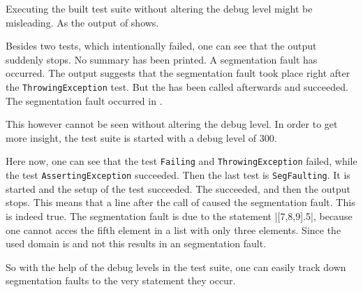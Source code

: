 

Executing the built test suite without altering the debug level might be misleading. As the output of  shows.


Besides two tests, which intentionally failed, one can see that the output suddenly stops. No summary has been printed. A segmentation fault has occurred.
The output suggests that the segmentation fault took place right after the {\tt ThrowingException} test. But the  has been called afterwards and succeeded. The segmentation fault occurred in .

This however cannot be seen without altering the debug level. In order to get more insight, the test suite is started with a debug level of $300$.


Here now, one can see that the test {\tt Failing} and {\tt ThrowingException} failed, while the test {\tt AssertingException} succeeded. Then the last test is {\tt SegFaulting}. It is started and the setup of the test succeeded. The  succeeded, and then the output stops. This means that a line after the call of  caused the segmentation fault. This is indeed true. The segmentation fault is due to the statement \adcode|[7,8,9].5|, because one cannot acces the fifth element in a list with only three elements. Since the used domain is  and not  this results in an segmentation fault.

So with the help of the debug levels in the test suite, one can easily track down segmentation faults to the very statement they occur.
